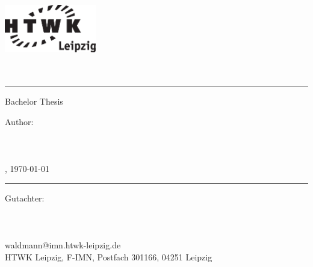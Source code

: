 
\begin{center}
    \includegraphics[width=4cm]{frontpage/HTWK_Logo_schwarz}\\
    \vspace{12pt}
    \large
        \textbf{\thesisUniversity}\\
    \vspace{6pt}
    \normalsize
        \thesisUniversityDepartment\\

    \vspace{24pt}
    \rule{\textwidth}{0.5pt}
    \vspace{12pt}

    \Huge
        Bachelor Thesis\\
    \vspace{12pt}
    \Large
        \textbf{\thesisTitle}
    \vspace{24pt}

    \small
        Author:\\
    \vspace{6pt}
    \large
        \textbf{\thesisAuthor}\\
        \vspace{3pt}
        \normalsize
        \thesisAuthorClass\\
        \thesisAuthorEmail\\
        \thesisAuthorCity, \today\\        

    \vspace{24pt}
    \rule{\textwidth}{0.5pt}
    \vspace{12pt}

    \vfill
    \small
        Gutachter:\\
    \vspace{6pt}
    \large
        \thesisAdvisor\\
    \small
        \thesisUniversity\\
        \thesisUniversityDepartment\\
        waldmann@imn.htwk-leipzig.de\\
        HTWK Leipzig, F-IMN, Postfach 301166, 04251 Leipzig
\end{center}

